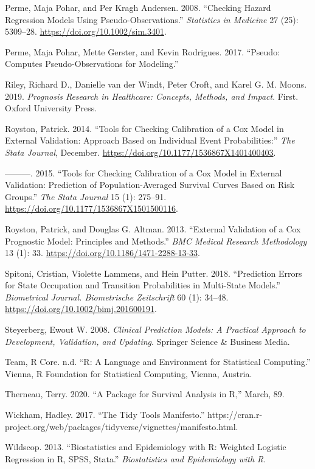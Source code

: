 \documentclass[
]{article}
\newlength{\cslhangindent}
\newenvironment{cslreferences}%
  {\setlength{\parindent}{0pt}%
  \everypar{\setlength{\hangindent}{\cslhangindent}}\ignorespaces}%
  {\par}
\begin{document}
\begin{cslreferences}
\leavevmode\hypertarget{ref-perme_checking_2008}{}%
Perme, Maja Pohar, and Per Kragh Andersen. 2008. ``Checking Hazard Regression Models Using Pseudo-Observations.'' \emph{Statistics in Medicine} 27 (25): 5309--28. \url{https://doi.org/10.1002/sim.3401}.

\leavevmode\hypertarget{ref-perme_pseudo_2017}{}%
Perme, Maja Pohar, Mette Gerster, and Kevin Rodrigues. 2017. ``Pseudo: Computes Pseudo-Observations for Modeling.''

\leavevmode\hypertarget{ref-riley_prognosis_2019}{}%
Riley, Richard D., Danielle van der Windt, Peter Croft, and Karel G. M. Moons. 2019. \emph{Prognosis Research in Healthcare: Concepts, Methods, and Impact}. First. Oxford University Press.

\leavevmode\hypertarget{ref-royston_tools_2014}{}%
Royston, Patrick. 2014. ``Tools for Checking Calibration of a Cox Model in External Validation: Approach Based on Individual Event Probabilities:'' \emph{The Stata Journal}, December. \url{https://doi.org/10.1177/1536867X1401400403}.

\leavevmode\hypertarget{ref-royston_tools_2015}{}%
---------. 2015. ``Tools for Checking Calibration of a Cox Model in External Validation: Prediction of Population-Averaged Survival Curves Based on Risk Groups.'' \emph{The Stata Journal} 15 (1): 275--91. \url{https://doi.org/10.1177/1536867X1501500116}.

\leavevmode\hypertarget{ref-royston_external_2013}{}%
Royston, Patrick, and Douglas G. Altman. 2013. ``External Validation of a Cox Prognostic Model: Principles and Methods.'' \emph{BMC Medical Research Methodology} 13 (1): 33. \url{https://doi.org/10.1186/1471-2288-13-33}.

\leavevmode\hypertarget{ref-spitoni_prediction_2018}{}%
Spitoni, Cristian, Violette Lammens, and Hein Putter. 2018. ``Prediction Errors for State Occupation and Transition Probabilities in Multi-State Models.'' \emph{Biometrical Journal. Biometrische Zeitschrift} 60 (1): 34--48. \url{https://doi.org/10.1002/bimj.201600191}.

\leavevmode\hypertarget{ref-steyerberg_clinical_2008}{}%
Steyerberg, Ewout W. 2008. \emph{Clinical Prediction Models: A Practical Approach to Development, Validation, and Updating}. Springer Science \& Business Media.

\leavevmode\hypertarget{ref-r_core_team_r_nodate}{}%
Team, R Core. n.d. ``R: A Language and Environment for Statistical Computing.'' Vienna, R Foundation for Statistical Computing, Vienna, Austria.

\leavevmode\hypertarget{ref-therneau_package_2020}{}%
Therneau, Terry. 2020. ``A Package for Survival Analysis in R,'' March, 89.

\leavevmode\hypertarget{ref-wickham_tidy_2017}{}%
Wickham, Hadley. 2017. ``The Tidy Tools Manifesto.'' https://cran.r-project.org/web/packages/tidyverse/vignettes/manifesto.html.

\leavevmode\hypertarget{ref-wildscop_biostatistics_2013}{}%
Wildscop. 2013. ``Biostatistics and Epidemiology with R: Weighted Logistic Regression in R, SPSS, Stata.'' \emph{Biostatistics and Epidemiology with R}.
\end{cslreferences}
\end{document}
